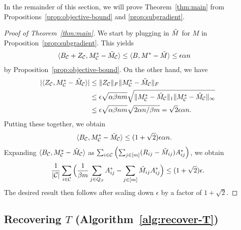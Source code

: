 In the remainder of this section, we will prove Theorem~\ref{thm:main} from Propositions~\ref{prop:objective-bound} 
and \ref{prop:subgradient}.
\begin{proof}[Proof of Theorem~\ref{thm:main}]
We start by plugging in $\tilde{M}$ for $M$ in Proposition~\ref{prop:subgradient}. This yields
\begin{align}
\langle B_{\mathcal{C}} + Z_{\mathcal{C}}, M^*_{\mathcal{C}} - \tilde{M}_{\mathcal{C}} \rangle &\leq \langle B, M^* - \tilde{M} \rangle 
 \leq \epsilon \alpha n
\end{align}
by Proposition~\ref{prop:objective-bound}.
On the other hand, we have 
\begin{align}
|\langle Z_{\mathcal{C}}, M^*_{\mathcal{C}} - \tilde{M}_{\mathcal{C}} \rangle| &\leq \|Z_{\mathcal{C}}\|_F\|M^*_{\mathcal{C}} - \tilde{M}_{\mathcal{C}}\|_F \\
 &\leq \epsilon\sqrt{\alpha\beta nm} \sqrt{\|M^*_{\mathcal{C}} - \tilde{M}_{\mathcal{C}}\|_{1}\|M^*_{\mathcal{C}} - \tilde{M}_{\mathcal{C}}\|_{\infty}} \\
 &\leq \epsilon\sqrt{\alpha\beta nm} \sqrt{2\alpha n/\beta m} = \sqrt{2}\epsilon\alpha n.
\end{align}
Putting these together, we obtain
\begin{align}
\langle B_{\mathcal{C}}, M^*_{\mathcal{C}} - \tilde{M}_{\mathcal{C}} \rangle &\leq (1+\sqrt{2})\epsilon \alpha n.
\end{align}
Expanding $\langle B_{\mathcal{C}}, M^*_{\mathcal{C}} - \tilde{M}_{\mathcal{C}} \rangle$ as 
$\sum_{i \in \mathcal{C}}\left( \sum_{j \in [m]} (R_{ij} - \tilde{M}_{ij})A^*_{ij} \right)$,
we obtain 
\[ \frac{1}{|\mathcal{C}|}\sum_{i \in \mathcal{C}}\Big(\frac{1}{\beta m}\sum_{j \in Q_{\beta}} A^*_{ij} - \sum_{j \in [m]} \tilde{M}_{ij}A^*_{ij}\Big) \leq (1+\sqrt{2})\epsilon. \]
The desired result then follows after scaling down $\epsilon$ 
by a factor of $1+\sqrt{2}$.
\end{proof}

\subsection{Recovering $T$ (Algorithm~\ref{alg:recover-T})}
\label{sec:approach-T}
\label{sec:rounding}

